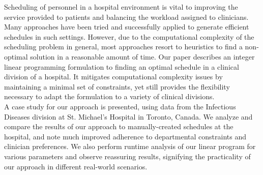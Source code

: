 Scheduling of personnel in a hospital environment is vital to improving the service provided to patients and balancing the workload assigned to clinicians. Many approaches have been tried and successfully applied to generate efficient schedules in such settings. However, due to the computational complexity of the scheduling problem in general, most approaches resort to heuristics to find a non-optimal solution in a reasonable amount of time. Our paper describes an integer linear programming formulation to finding an optimal schedule in a clinical division of a hospital. It mitigates computational complexity issues by maintaining a minimal set of constraints, yet still provides the flexibility necessary to adapt the formulation to a variety of clinical divisions. \\

A case study for our approach is presented, using data from the Infectious Diseases division at St. Michael's Hospital in Toronto, Canada. We analyze and compare the results of our approach to manually-created schedules at the hospital, and note much improved adherence to departmental constraints and clinician preferences. We also perform runtime analysis of our linear program for various parameters and observe reassuring results, signifying the practicality of our approach in different real-world scenarios.